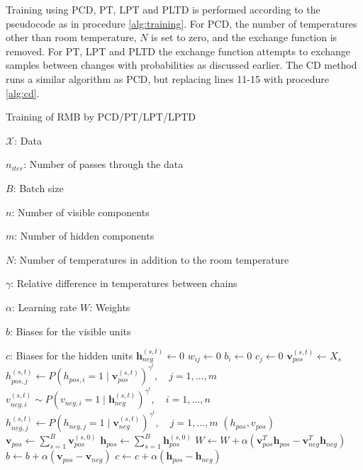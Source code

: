 Training using PCD, PT, LPT and PLTD is performed according to the pseudocode as in procedure \ref{alg:training}. For PCD, the number of temperatures other than room temperature, $N$ is set to zero, and the exchange function is removed. For PT, LPT and PLTD the exchange function attempts to exchange samples between changes with probabilities as discussed earlier. The CD method runs a similar algorithm as PCD, but replacing lines 11-15 with procedure \ref{alg:cd}.
\begin{algorithm}
\caption{Training of RMB by PCD/PT/LPT/LPTD}\label{alg:training}
\begin{algorithmic}[1]
	\Require 
		$\mathcal{X}$: Data \par
		$n_{iter}$: Number of passes through the data \par
		$B$: Batch size \par
		$n$: Number of visible components \par
		$m$: Number of hidden components \par
		$N$: Number of temperatures in addition to the room temperature \par
		$\gamma$: Relative difference in temperatures between chains \par
		$\alpha$: Learning rate  
	\Ensure
		$W$: Weights \par
		$b$: Biases for the visible units\par
		$c$: Biases for the hidden units
		\State $\mathbf{h}_{neg}^{(s,t)} \gets 0$ 
	\EndFor
		\State $w_{ij}  \gets 0$ 
		\State $b_{i}  \gets 0$ 
		\State $c_{j}  \gets 0$ 
	\EndFor 
		 
			 
				 
					\State $\mathbf{v}_{pos}^{(s,t)} \gets X_s$ 
					\State $h_{pos,j}^{(s,t)} \gets P(h_{pos,i} = 1 \mid \mathbf{v}_{pos}^{(s,t)})^{\gamma^t}, \quad j=1,\dots,m$ 
					\State $v_{neg,i}^{(s,t)} \sim  P(v_{neg,i} = 1 \mid \mathbf{h}_{neg}^{(s,t)})^{\gamma^t}, \quad i=1,\dots,n$ 
					\State $h_{neg,j}^{(s,t)} \gets P(h_{neg,j} = 1 \mid \mathbf{v}_{neg}^{(s,t)})^{\gamma^t}, \quad j=1,\dots,m$ 
				\EndFor
			\EndFor
			\State {}$(h_{pos}, v_{pos})$ 
			\State $\mathbf{v}_{pos} \gets \sum_{s=1}^{B} \mathbf{v}_{pos}^{(s,0)}$
			\State $\mathbf{h}_{pos} \gets \sum_{s=1}^{B} \mathbf{h}_{pos}^{(s,0)}$
			\State $W \gets W + \alpha \left(\mathbf{v}_{pos}^T\mathbf{h}_{pos} - \mathbf{v}_{neg}^T\mathbf{h}_{neg} \right)$
			\State $b \gets b + \alpha \left(\mathbf{v}_{pos} - \mathbf{v}_{neg}\right)$
			\State $c \gets c + \alpha \left(\mathbf{h}_{pos} - \mathbf{h}_{neg}\right)$
			

\end{algorithmic}
\end{algorithm}
